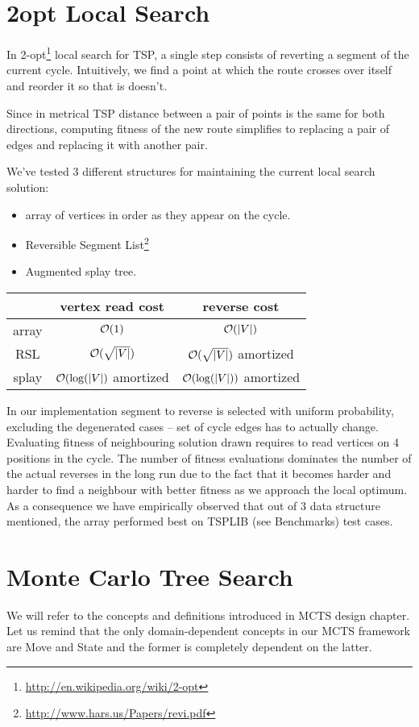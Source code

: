 \section{2opt Local Search}

In 2-opt\footnote{\url{http://en.wikipedia.org/wiki/2-opt}} local search for TSP, a single step
consists of reverting a segment of the current cycle. Intuitively, we find a point
at which the route crosses over itself and reorder it so that is doesn't.

Since in metrical TSP distance between a pair of points is the same for both directions,
computing fitness of the new route simplifies to replacing a pair of edges and replacing it with another
pair.

We've tested 3 different structures for maintaining the current local search solution:
\begin{itemize}
\item array of vertices in order as they appear on the cycle.
\item Reversible Segment List\footnote{\url{http://www.hars.us/Papers/revi.pdf}}
\item Augmented splay tree.
\end{itemize}

\begin{tabular}{c|cc}
& vertex read cost & reverse cost \\\hline
array & $\mathcal{O}(1)$ & $\mathcal{O}(|V|)$ \\
RSL & $\mathcal{O}(\sqrt{|V|})$ & $\mathcal{O}(\sqrt{|V|})$ amortized \\
splay & $\mathcal{O}(\log(|V|)$ amortized & $\mathcal{O}(\log(|V|))$ amortized
\end{tabular}

In our implementation segment to reverse is selected with uniform probability,
excluding the degenerated cases -- set of cycle edges has to actually change.
Evaluating fitness of neighbouring solution drawn requires to read vertices
on 4 positions in the cycle. The number of fitness evaluations dominates
the number of the actual reverses in the long run due to the fact that it
becomes harder and harder to find a neighbour with better fitness as we approach
the local optimum. As a consequence we have empirically observed that out of
3 data structure mentioned, the array performed best on TSPLIB (see Benchmarks)
test cases.

\section{Monte Carlo Tree Search}
We will refer to the concepts and definitions introduced in MCTS design
chapter. Let us remind that the only domain-dependent concepts in our MCTS
framework are Move and State and the former is completely dependent on the
latter.


